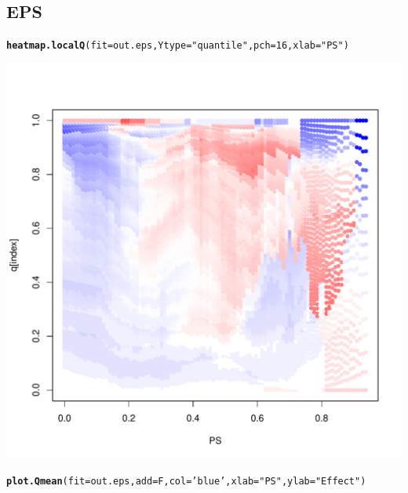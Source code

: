 \documentclass{article}\usepackage[]{graphicx}\usepackage[]{color}
\makeatletter
\def\maxwidth{ %
  \ifdim\Gin@nat@width>\linewidth
    \linewidth
  \else
    \Gin@nat@width
  \fi
}
\newcommand{\hlnum}[1]{\textcolor[rgb]{0.686,0.059,0.569}{#1}}%
\newcommand{\hlstr}[1]{\textcolor[rgb]{0.192,0.494,0.8}{#1}}%
\newcommand{\hlstd}[1]{\textcolor[rgb]{0.345,0.345,0.345}{#1}}%
\newcommand{\hlkwc}[1]{\textcolor[rgb]{0.333,0.667,0.333}{#1}}%
\newcommand{\hlkwd}[1]{\textcolor[rgb]{0.737,0.353,0.396}{\textbf{#1}}}%
\newenvironment{kframe}{%
 \def\at@end@of@kframe{}%
 \ifinner\ifhmode%
  \def\at@end@of@kframe{\end{minipage}}%
  \begin{minipage}{\columnwidth}%
 \fi\fi%
 \def\FrameCommand##1{\hskip\@totalleftmargin \hskip-\fboxsep
 \colorbox{shadecolor}{##1}\hskip-\fboxsep
     \hskip-\linewidth \hskip-\@totalleftmargin \hskip\columnwidth}%
 \MakeFramed {\advance\hsize-\width
   \@totalleftmargin\z@ \linewidth\hsize
   \@setminipage}}%
 {\par\unskip\endMakeFramed%
 \at@end@of@kframe}
\newenvironment{knitrout}{}{} %
\makeatother
\begin{document}
\subsection{EPS}
\begin{knitrout}
\color{fgcolor}\begin{kframe}
\begin{alltt}
\hlkwd{heatmap.localQ}\hlstd{(}\hlkwc{fit}\hlstd{=out.eps ,} \hlkwc{Ytype}\hlstd{=}\hlstr{"quantile"} \hlstd{,} \hlkwc{pch}\hlstd{=}\hlnum{16} \hlstd{,} \hlkwc{xlab}\hlstd{=}\hlstr{"PS"}\hlstd{)}
\end{alltt}
\end{kframe}

{\centering \includegraphics[width=\maxwidth]{figures/EPS-heatmap-1} 

}


\begin{kframe}\begin{alltt}
\hlkwd{plot.Qmean}\hlstd{(}\hlkwc{fit}\hlstd{=out.eps ,} \hlkwc{add}\hlstd{=F ,} \hlkwc{col}\hlstd{=}\hlstr{'blue'} \hlstd{,} \hlkwc{xlab}\hlstd{=}\hlstr{"PS"} \hlstd{,} \hlkwc{ylab}\hlstd{=}\hlstr{"Effect"}\hlstd{)}
\end{alltt}
\end{kframe}


\end{knitrout}
\end{document}
